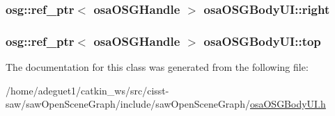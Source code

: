 \hypertarget{classosa_o_s_g_body_u_i_a7cda4d7ffa7040ba452edd7e31ebf6f5}{
\subsubsection[{right}]{\setlength{\rightskip}{0pt plus 5cm}osg\-::ref\-\_\-ptr$<$ {\bf osa\-O\-S\-G\-Handle} $>$ osa\-O\-S\-G\-Body\-U\-I\-::right\hspace{0.3cm}{\ttfamily [protected]}}}\label{classosa_o_s_g_body_u_i_a7cda4d7ffa7040ba452edd7e31ebf6f5}
\hypertarget{classosa_o_s_g_body_u_i_a5737e52da9fa403eee45b672873e51c1}{
\subsubsection[{top}]{\setlength{\rightskip}{0pt plus 5cm}osg\-::ref\-\_\-ptr$<$ {\bf osa\-O\-S\-G\-Handle} $>$ osa\-O\-S\-G\-Body\-U\-I\-::top\hspace{0.3cm}{\ttfamily [protected]}}}\label{classosa_o_s_g_body_u_i_a5737e52da9fa403eee45b672873e51c1}


The documentation for this class was generated from the following file\-:\begin{DoxyCompactItemize}
\item 
/home/adeguet1/catkin\-\_\-ws/src/cisst-\/saw/saw\-Open\-Scene\-Graph/include/saw\-Open\-Scene\-Graph/\hyperlink{osa_o_s_g_body_u_i_8h}{osa\-O\-S\-G\-Body\-U\-I.\-h}\end{DoxyCompactItemize}
